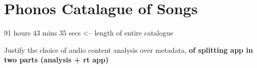 \chapter{Phonos Catalague of Songs} %

\label{Chapter4} %


91 hours 43 mins 35 secs  <-- length of entire catalogue

Justify the choice of audio content analysis over metadata, \textbf{of splitting app in two parts (analysis + rt app)}